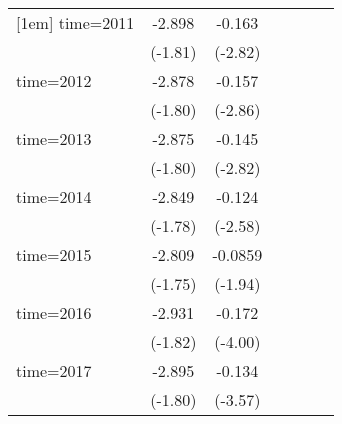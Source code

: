 \begin{table}[htbp]
\begin{tabular}{l*{6}{c}}
[1em]
time=2011           &      -2.898\sym{*}  &      -0.163\sym{**} &                     &                     &                     &                     \\
                    &     (-1.81)         &     (-2.82)         &                     &                     &                     &                     \\
[1em]
time=2012           &      -2.878\sym{*}  &      -0.157\sym{***}&                     &                     &                     &                     \\
                    &     (-1.80)         &     (-2.86)         &                     &                     &                     &                     \\
[1em]
time=2013           &      -2.875\sym{*}  &      -0.145\sym{**} &                     &                     &                     &                     \\
                    &     (-1.80)         &     (-2.82)         &                     &                     &                     &                     \\
[1em]
time=2014           &      -2.849\sym{*}  &      -0.124\sym{**} &                     &                     &                     &                     \\
                    &     (-1.78)         &     (-2.58)         &                     &                     &                     &                     \\
[1em]
time=2015           &      -2.809\sym{*}  &     -0.0859\sym{*}  &                     &                     &                     &                     \\
                    &     (-1.75)         &     (-1.94)         &                     &                     &                     &                     \\
[1em]
time=2016           &      -2.931\sym{*}  &      -0.172\sym{***}&                     &                     &                     &                     \\
                    &     (-1.82)         &     (-4.00)         &                     &                     &                     &                     \\
[1em]
time=2017           &      -2.895\sym{*}  &      -0.134\sym{***}&                     &                     &                     &                     \\
                    &     (-1.80)         &     (-3.57)         &                     &                     &                     &                     \\

\end{tabular}
\end{table}
